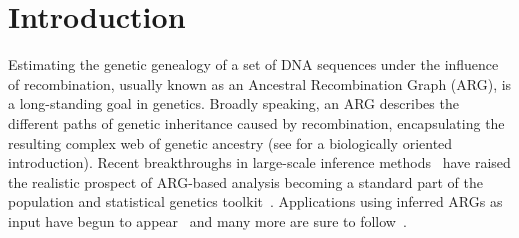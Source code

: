 \documentclass{article}
\begin{document}
\section{Introduction}
\label{sec-intro}
Estimating the genetic genealogy of a set of DNA sequences
under the influence of recombination,
usually known as an Ancestral Recombination Graph (ARG), is a long-standing
goal in genetics.
Broadly speaking, an ARG describes the different paths of genetic inheritance
caused by recombination, encapsulating the resulting complex web of genetic
ancestry
(see \citet{lewanski2023era} for a biologically oriented introduction).
Recent breakthroughs
in large-scale inference
methods~\citep{rasmussen2014genome,kelleher2019inferring,speidel2019method,
schaefer2021ancestral,wohns2022unified,zhang2023biobank,zhan2023towards}
have raised the realistic prospect of ARG-based analysis becoming a standard part
of the population and statistical genetics toolkit~\citep{hejase2020summary}.
Applications using inferred ARGs as input have begun to
appear~\citep{osmond2021estimating,
fan2022genealogical,
hejase2022deep,
guo2022recombination,
zhang2023biobank,
nowbandegani2023extremely,
ignatieva2023distribution,
fan2023likelihood}
and many more are sure to
follow~\citep{harris2019database,harris2023using}.
\end{document}
